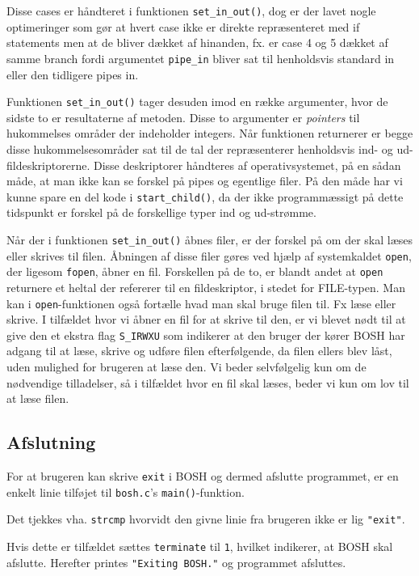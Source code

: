 Disse cases er håndteret i funktionen \verb+set_in_out()+, dog er der lavet nogle optimeringer som gør at hvert case ikke er direkte repræsenteret med if statements men at de bliver dækket af hinanden, fx. er case 4 og 5 dækket af samme branch fordi argumentet \texttt{pipe\_in} bliver sat til henholdsvis standard in eller den tidligere pipes in.

Funktionen \texttt{set\_in\_out()} tager desuden imod en række argumenter, hvor de sidste to er resultaterne af metoden. Disse to argumenter er \textit{pointers} til hukommelses områder der indeholder integers. Når funktionen returnerer er begge disse hukommelsesområder sat til de tal der repræsenterer henholdsvis ind- og ud-fildeskriptorerne. Disse deskriptorer håndteres af operativsystemet, på en sådan måde, at man ikke kan se forskel på pipes og egentlige filer. På den måde har vi kunne spare en del kode i \texttt{start\_child()}, da der ikke programmæssigt på dette tidspunkt er forskel på de forskellige typer ind og ud-strømme.

Når der i funktionen \texttt{set\_in\_out()} åbnes filer, er der forskel på om der skal læses eller skrives til filen. Åbningen af disse filer gøres ved hjælp af systemkaldet \texttt{open}, der ligesom \texttt{fopen}, åbner en fil. Forskellen på de to, er blandt andet at \texttt{open} returnere et heltal der refererer til en fildeskriptor, i stedet for FILE-typen. Man kan i \texttt{open}-funktionen også fortælle hvad man skal bruge filen til. Fx læse eller skrive. I tilfældet hvor vi åbner en fil for at skrive til den, er vi blevet nødt til at give den et ekstra flag \texttt{S\_IRWXU} som indikerer at den bruger der kører BOSH har adgang til at læse, skrive og udføre filen efterfølgende, da filen ellers blev låst, uden mulighed for brugeren at læse den. Vi beder selvfølgelig kun om de nødvendige tilladelser, så i tilfældet hvor en fil skal læses, beder vi kun om lov til at læse filen.

\subsection{Afslutning}
For at brugeren kan skrive \verb+exit+ i BOSH og dermed afslutte programmet, er en enkelt linie tilføjet til \verb+bosh.c+'s \verb+main()+-funktion. 

Det tjekkes vha. \verb+strcmp+ hvorvidt den givne linie fra brugeren ikke er lig \verb+"exit"+.

Hvis dette er tilfældet sættes \verb+terminate+ til \verb+1+, hvilket indikerer, at BOSH skal afslutte. Herefter printes \verb+"Exiting BOSH."+ og programmet afsluttes. 
